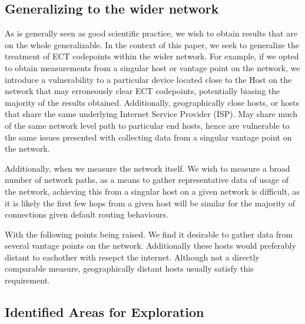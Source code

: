 \documentclass{l4proj}
\begin{document}
\subsection{Generalizing to the wider network}
\label{sec:general}

As is generally seen as good scientific practice, we wish to obtain results that are on the whole generalizable. In the context of this paper, we seek to generalize the treatment of ECT codepoints within the wider network. For example, if we opted to obtain measurements from a singular host or vantage point on the network, we introduce a vulnerability to a particular device located close to the Host on the network that may erroneously clear ECT codepoints, potentially biasing the majority of the results obtained. Additionally, geographically close hosts, or hosts that share the same underlying Internet Service Provider (ISP). May share much of the same network level path to particular end hosts, hence are vulnerable to the same issues presented with collecting data from a singular vantage point on the network. 

Additionally, when we measure the network itself. We wish to measure a broad number of network paths, as a means to gather representative data of usage of the network, achieving this from a singular host on a given network is difficult, as it is likely the first few hops from a given host will be similar for the majority of connections given default routing behaviours.

With the following points being raised. We find it desirable to gather data from several vantage points on the network. Additionally these hosts would preferably distant to eachother with resepct the internet. Although not a directly comparable measure, geographically distant hosts usually satisfy this requirement.

\subsection{Identified Areas for Exploration}
\end{document}
